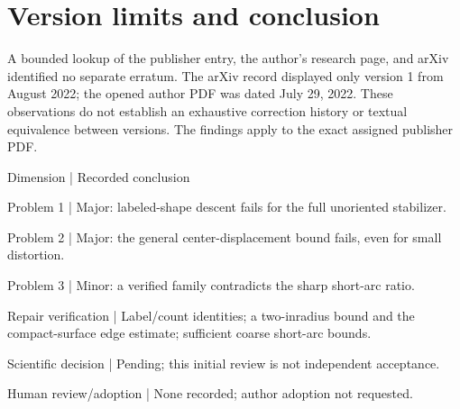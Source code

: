 \documentclass[10pt]{article}
\begin{document}
\section*{Version limits and conclusion}
A bounded lookup of the publisher entry, the author’s research page, and arXiv identified no separate erratum. The arXiv record displayed only version 1 from August 2022; the opened author PDF was dated July 29, 2022. These observations do not establish an exhaustive correction history or textual equivalence between versions. The findings apply to the exact assigned publisher PDF.\par
Dimension | Recorded conclusion\par
Problem 1 | Major: labeled-shape descent fails for the full unoriented stabilizer.\par
Problem 2 | Major: the general center-displacement bound fails, even for small distortion.\par
Problem 3 | Minor: a verified family contradicts the sharp short-arc ratio.\par
Repair verification | Label/count identities; a two-inradius bound and the compact-surface edge estimate; sufficient coarse short-arc bounds.\par
Scientific decision | Pending; this initial review is not independent acceptance.\par
Human review/adoption | None recorded; author adoption not requested.\par
\end{document}
